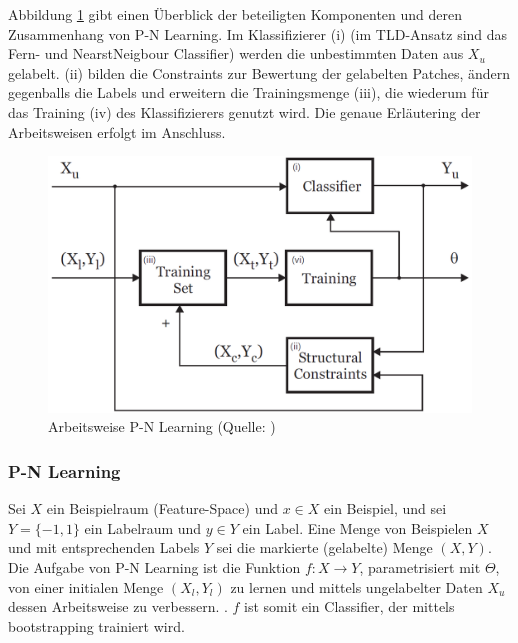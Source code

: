 	Abbildung \ref{abb:pnl} gibt einen Überblick der beteiligten Komponenten und deren Zusammenhang von P-N Learning. Im Klassifizierer (i) (im	TLD-Ansatz sind das Fern- und NearstNeigbour Classifier) werden die unbestimmten Daten aus $X_{u}$ gelabelt. (ii) bilden die Constraints zur Bewertung der gelabelten Patches, ändern gegenballs die Labels und erweitern die Trainingsmenge (iii), die wiederum für das Training (iv) des Klassifizierers genutzt wird. Die genaue Erläutering der Arbeitsweisen erfolgt im Anschluss.

	\begin{figure}
	\begin{centering}
	\includegraphics[scale=0.4]{../pictures/PN_LEARNING.png}\caption{Arbeitsweise P-N Learning (Quelle: \cite{PNL})}
	\label{abb:pnl}
	\par\end{centering}
	\end{figure}

	\subsubsection{P-N Learning}

	Sei $X$ ein Beispielraum (Feature-Space) und $x\in X$ ein Beispiel, und sei $Y=\{-1,1\}$ ein Labelraum und $y\in Y$ ein Label. Eine Menge von Beispielen $X$ und mit entsprechenden Labels $Y$ sei die markierte (gelabelte) Menge $(X,Y)$. Die Aufgabe von P-N Learning ist die Funktion $f:X\rightarrow Y$, parametrisiert mit $\Theta$, von einer initialen Menge $(X_{l},Y_{l})$ zu lernen und mittels ungelabelter Daten $X_{u}$ dessen Arbeitsweise zu verbessern. . $f$ ist somit ein Classifier, der mittels bootstrapping trainiert wird.

